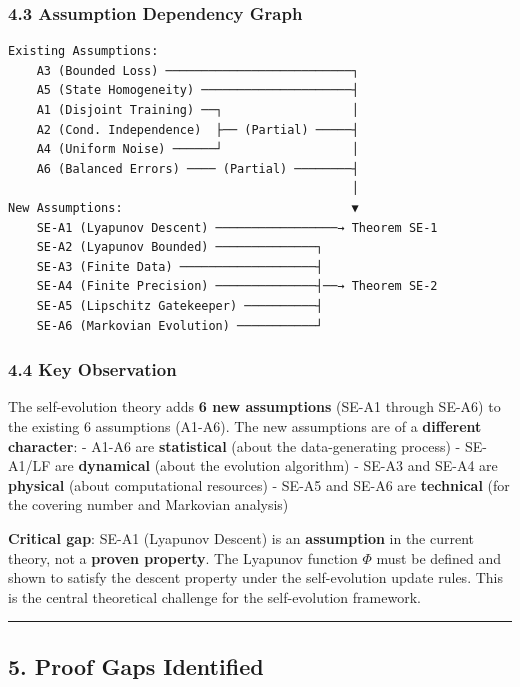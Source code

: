 \documentclass[
  12pt,
]{ctexart}
\begin{document}
\subsubsection{4.3 Assumption Dependency
Graph}\label{assumption-dependency-graph}

\begin{verbatim}
Existing Assumptions:
    A3 (Bounded Loss) ──────────────────────────┐
    A5 (State Homogeneity) ─────────────────────┤
    A1 (Disjoint Training) ──┐                  │
    A2 (Cond. Independence)  ├── (Partial) ─────┤
    A4 (Uniform Noise) ──────┘                  │
    A6 (Balanced Errors) ──── (Partial) ────────┤
                                                │
New Assumptions:                                ▼
    SE-A1 (Lyapunov Descent) ─────────────────→ Theorem SE-1
    SE-A2 (Lyapunov Bounded) ──────────────┐
    SE-A3 (Finite Data) ───────────────────┤
    SE-A4 (Finite Precision) ──────────────┤──→ Theorem SE-2
    SE-A5 (Lipschitz Gatekeeper) ──────────┤
    SE-A6 (Markovian Evolution) ───────────┘
\end{verbatim}

\subsubsection{4.4 Key Observation}\label{key-observation}

The self-evolution theory adds \textbf{6 new assumptions} (SE-A1 through
SE-A6) to the existing 6 assumptions (A1-A6). The new assumptions are of
a \textbf{different character}: - A1-A6 are \textbf{statistical} (about
the data-generating process) - SE-A1/LF are \textbf{dynamical} (about
the evolution algorithm) - SE-A3 and SE-A4 are \textbf{physical} (about
computational resources) - SE-A5 and SE-A6 are \textbf{technical} (for
the covering number and Markovian analysis)

\textbf{Critical gap}: SE-A1 (Lyapunov Descent) is an
\textbf{assumption} in the current theory, not a \textbf{proven
property}. The Lyapunov function \(\Phi\) must be defined and shown to
satisfy the descent property under the self-evolution update rules. This
is the central theoretical challenge for the self-evolution framework.

\begin{center}\rule{0.5\linewidth}{0.5pt}\end{center}

\subsection{5. Proof Gaps Identified}\label{proof-gaps-identified}
\end{document}
